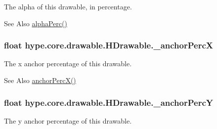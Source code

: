 The alpha of this drawable, in percentage. 

\begin{DoxySeeAlso}{See Also}
\hyperlink{classhype_1_1core_1_1drawable_1_1_h_drawable_a40489fffc3b4e24a27ed8b1bfa38ca7d}{alpha\-Perc()} 
\end{DoxySeeAlso}
\hypertarget{classhype_1_1core_1_1drawable_1_1_h_drawable_aafd5ea67637b380c4b81ad3e093e8c40}{
\subsubsection[{\-\_\-anchor\-Perc\-X}]{\setlength{\rightskip}{0pt plus 5cm}float hype.\-core.\-drawable.\-H\-Drawable.\-\_\-anchor\-Perc\-X\hspace{0.3cm}{\ttfamily [protected]}}}\label{classhype_1_1core_1_1drawable_1_1_h_drawable_aafd5ea67637b380c4b81ad3e093e8c40}


The x anchor percentage of this drawable. 

\begin{DoxySeeAlso}{See Also}
\hyperlink{classhype_1_1core_1_1drawable_1_1_h_drawable_a61972696a8beb2118f118de9cbab90aa}{anchor\-Perc\-X()} 
\end{DoxySeeAlso}
\hypertarget{classhype_1_1core_1_1drawable_1_1_h_drawable_a14172ed41bc22c209a9a7aae34a8d835}{
\subsubsection[{\-\_\-anchor\-Perc\-Y}]{\setlength{\rightskip}{0pt plus 5cm}float hype.\-core.\-drawable.\-H\-Drawable.\-\_\-anchor\-Perc\-Y\hspace{0.3cm}{\ttfamily [protected]}}}\label{classhype_1_1core_1_1drawable_1_1_h_drawable_a14172ed41bc22c209a9a7aae34a8d835}


The y anchor percentage of this drawable. 

